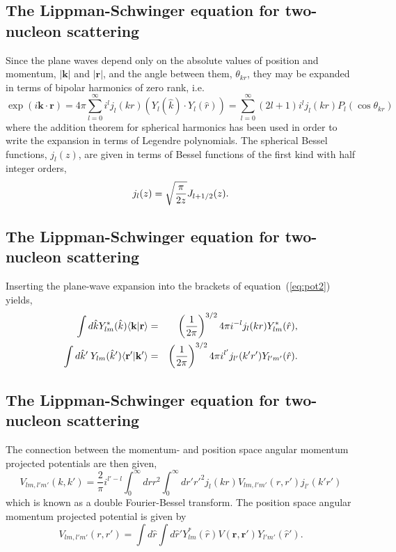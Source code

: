 \documentclass[%
twoside,                 %
final,                   %
10pt]{article}
\begin{document}
\subsection{The Lippman-Schwinger equation for two-nucleon scattering}
\begin{block}{}
Since the plane waves depend only on the absolute values of position and momentum, 
$\vert\mathbf{k}\vert$ and $ \vert\mathbf{r}\vert$,
and the angle between them, $\theta_{kr}$, they may be expanded in terms of bipolar harmonics of 
zero rank, i.e.  
\[ 
  \exp{(i \mathbf{k}\cdot \mathbf{r})} = 4\pi\sum_{l=0}^{\infty} i^l j_l(kr)\left( Y_l(\hat{k}) \cdot Y_l(\hat{r}) \right)= \sum_{l=0}^{\infty} (2l+1)i^l j_l(kr) P_l(\cos \theta_{kr}) 
\]
where the addition theorem for spherical harmonics has been used in order to write
the expansion in terms of Legendre polynomials. The spherical Bessel functions, $j_l(z)$,  
are given in terms of Bessel functions of the first kind with half integer orders,  
\[
j_l(z) = \sqrt{\pi \over 2 z} J_{l+1/2}(z).  
\]
\end{block}

\subsection{The Lippman-Schwinger equation for two-nucleon scattering}
\begin{block}{}
Inserting the plane-wave expansion
into the brackets of equation~(\ref{eq:pot2}) yields, 
\begin{eqnarray*}
  \nonumber
  \int d{\hat{k}}  Y_{lm}^*(\hat{k})\langle \mathbf{k}\vert \mathbf{r} \rangle & = &  
  \left( {1\over 2\pi} \right) ^{3/2}4\pi i^{-l} j_l(kr) Y_{lm}^*(\hat{r}), \\  
  \nonumber
  \int d{\hat{k}'}\:   Y_{lm}(\hat{k}') \langle \mathbf{r'}\vert \mathbf{k}' \rangle & = &  
  \left( {1\over 2\pi} \right) ^{3/2}4\pi i^{l'} j_{l'}(k'r') Y_{l'm'}(\hat{r}). 
\end{eqnarray*}
\end{block}

\subsection{The Lippman-Schwinger equation for two-nucleon scattering}
\begin{block}{}
The connection between the momentum- and position space angular momentum 
projected potentials are then given, 
\[
  V_{lm, l'm'}(k,k')=\frac{2}{\pi}i^{l'-l}\int_0^\infty drr^2 \int_0^\infty dr'{r'}^2j_l(kr) V_{lm,l'm'}(r,r') j_{l'}(k'r')
  \label{eq:pot3}
\]
which is known as a double Fourier-Bessel transform. The position space angular 
momentum projected potential is given by
\[
  V_{lm, l'm'}(r,r') = \int d{\hat{r}} \int d{\hat{r}'}Y_{lm}^*(\hat{r})V(\mathbf{r}, \mathbf{r'})Y_{l'm'}(\hat{r}').
  \label{eq:pot4}
\]
\end{block}
\end{document}
